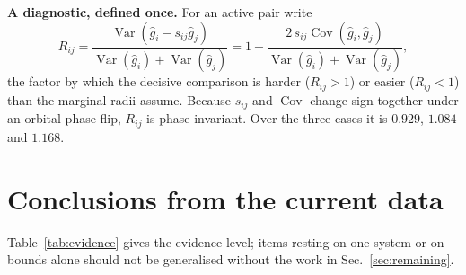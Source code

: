 \documentclass[10pt]{article}
\newcommand{\Var}{\operatorname{Var}}
\newcommand{\Cov}{\operatorname{Cov}}
\begin{document}
\textbf{A diagnostic, defined once.} For an active pair write
\begin{equation}
  R_{ij}=\frac{\Var\!\left(\widehat g_i-s_{ij}\widehat g_j\right)}
              {\Var(\widehat g_i)+\Var(\widehat g_j)}
        =1-\frac{2\,s_{ij}\Cov(\widehat g_i,\widehat g_j)}
                {\Var(\widehat g_i)+\Var(\widehat g_j)} ,
  \label{eq:Rij}
\end{equation}
the factor by which the decisive comparison is harder ($R_{ij}>1$) or easier
($R_{ij}<1$) than the marginal radii assume. Because $s_{ij}$ and
$\Cov$ change sign together under an orbital phase flip, $R_{ij}$ is
phase-invariant. Over the three cases it is $0.929$, $1.084$ and $1.168$.

\section{Conclusions from the current data}
\label{sec:conclusions}

Table~\ref{tab:evidence} gives the evidence level; items resting on one system or
on bounds alone should not be generalised without the work in
Sec.~\ref{sec:remaining}.
\end{document}
